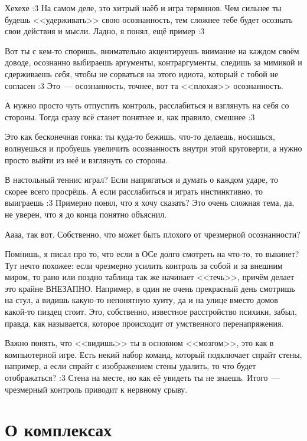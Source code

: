 \documentclass[a5paper,12pt,twoside]{memoir}
\begin{document}
\medskip
Хехехе :3 На самом деле, это хитрый наёб и игра терминов. Чем сильнее ты будешь <<удерживать>> свою осознанность, тем сложнее тебе будет осознать свои действия и мысли. 
Ладно, я понял, ещё пример :3 

Вот ты с кем-то споришь, внимательно акцентируешь внимание на каждом своём доводе, осознанно выбираешь аргументы, контраргументы, следишь за мимикой и сдерживаешь себя, чтобы не сорваться на этого идиота, который с тобой не согласен :3 Это~--- осознанность, точнее, вот та <<плохая>> осознанность.
 
А нужно просто чуть отпустить контроль, расслабиться и взглянуть на себя со стороны. Тогда сразу всё станет понятнее и, как правило, смешнее :3
 
Это как бесконечная гонка: ты куда-то бежишь, что-то делаешь, носишься, волнуешься и пробуешь увеличить осознанность внутри этой круговерти, а нужно просто выйти из неё и взглянуть со стороны. 

В настольный теннис играл? Если напрягаться и думать о каждом ударе, то скорее всего просрёшь. А если расслабиться и играть инстинктивно, то выиграешь :3 
Примерно понял, что я хочу сказать? Это очень сложная тема, да, не уверен, что я до конца понятно объяснил. 

Аааа, так вот. Собственно, что может быть плохого от чрезмерной осознанности? 

Помнишь, я писал про то, что если в ОСе долго смотреть на что-то, то выкинет? Тут нечто похожее: если чрезмерно усилить контроль за собой и за внешним миром, то рано или поздно таблица так же начинает <<течь>>, причём делает это крайне ВНЕЗАПНО. Например, в один не очень прекрасный день смотришь на стул, а видишь какую-то непонятную хуиту, да и на улице вместо домов какой-то пиздец стоит. Это, собственно, известное расстройство психики, забыл, правда, как называется, которое происходит от умственного перенапряжения. 

Важно понять, что <<видишь>> ты в основном <<мозгом>>, это как в компьютерной игре. Есть некий набор команд, который подключает спрайт стены, например, а если спрайт с изображением стены удалить, то что будет отображаться? :3 Стена на месте, но как её увидеть ты не знаешь. Итого~--- чрезмерный контроль приводит к нервному срыву. 




\section{О комплексах}
\end{document}
